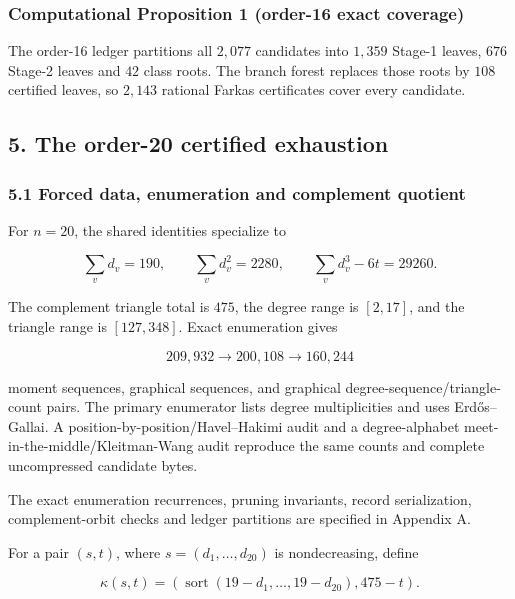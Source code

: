 \documentclass[
  english,
  11pt,
  a4paper,
]{article}
\begin{document}
\subsubsection{Computational Proposition 1 (order-16 exact
coverage)}\label{computational-proposition-1-order-16-exact-coverage}

The order-16 ledger partitions all \(2{,}077\) candidates into
\(1{,}359\) Stage-1 leaves, \(676\) Stage-2 leaves and \(42\) class
roots. The branch forest replaces those roots by \(108\) certified
leaves, so \(2{,}143\) rational Farkas certificates cover every
candidate.

\subsection{5. The order-20 certified
exhaustion}\label{the-order-20-certified-exhaustion}

\subsubsection{5.1 Forced data, enumeration and complement
quotient}\label{forced-data-enumeration-and-complement-quotient}

For \(n=20\), the shared identities specialize to

\[
\sum_vd_v=190,
\qquad
\sum_vd_v^2=2280,
\qquad
\sum_vd_v^3-6t=29260.
\tag{5.1}
\]

The complement triangle total is \(475\), the degree range is
\([2,17]\), and the triangle range is \([127,348]\). Exact enumeration
gives

\[
209{,}932\longrightarrow200{,}108\longrightarrow160{,}244
\tag{5.2}
\]

moment sequences, graphical sequences, and graphical
degree-sequence/triangle-count pairs. The primary enumerator lists
degree multiplicities and uses Erdős--Gallai. A
position-by-position/Havel--Hakimi audit and a degree-alphabet
meet-in-the-middle/Kleitman-Wang audit reproduce the same counts and
complete uncompressed candidate bytes.

The exact enumeration recurrences, pruning invariants, record
serialization, complement-orbit checks and ledger partitions are
specified in Appendix A.

For a pair \((s,t)\), where \(s=(d_1,\ldots,d_{20})\) is nondecreasing,
define

\[
\kappa(s,t)
=\left(\operatorname{sort}(19-d_1,\ldots,19-d_{20}),475-t\right).
\tag{5.3}
\]
\end{document}
